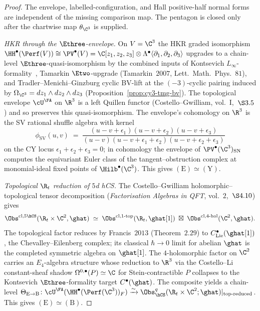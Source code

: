 \begin{proof}
The envelope, labelled-configuration, and Hall positive-half normal
forms are independent of the missing comparison map. The pentagon is
closed only after the chartwise map $\theta_{\C^3}$ is supplied.

\emph{HKR through the $\Ethree$-envelope.} On $V=\C^3$ the HKR graded
isomorphism
$\HH^\bullet(\Perf(V))\cong\PV^\bullet(V)=\C[z_1,z_2,z_3]\otimes
\Lambda^\bullet\langle\partial_1,\partial_2,\partial_3\rangle$
upgrades to a chain-level $\Ethree$-quasi-isomorphism by the combined
inputs of Kontsevich $L_\infty$-formality~\cite{Kontsevich1999},
Tamarkin $\Etwo$-upgrade (Tamarkin~$2007$,
Lett.~Math.~Phys.~$81$), and Tradler--Menichi--Ginzburg cyclic
BV-lift at the $(-3)$-cyclic pairing induced by
$\Omega_{\C^3}=dz_1\wedge dz_2\wedge dz_3$
\textup{(}Proposition~\ref{prop:cy3-tmg-bv}\textup{)}. The topological
envelope $\cU^\FA$ on $\R^3$ is a left Quillen functor
\textup{(}Costello--Gwilliam, vol.~I,~$\S 3.5$\textup{)} and so
preserves this quasi-isomorphism. The envelope's cohomology on $\R^3$
is the SV rational shuffle algebra with kernel
\[
\phi_{\mathrm{SV}}(u,v)\;=\;
\frac{(u-v+\epsilon_1)(u-v+\epsilon_2)(u-v+\epsilon_3)}
{(u-v)(u-v+\epsilon_1+\epsilon_2)(u-v+\epsilon_2+\epsilon_3)}
\]
on the CY locus $\epsilon_1+\epsilon_2+\epsilon_3=0$; in cohomology the
envelope of $\PV^\bullet(\C^3)_{\mathrm{SN}}$ computes the equivariant
Euler class of the tangent--obstruction complex at monomial-ideal fixed
points of $\Hilb^\bullet(\C^3)$. This gives
$(\mathrm E)\simeq(\mathrm Y)$.

\emph{Topological $\R_t$ reduction of $5$d hCS.} The
Costello--Gwilliam holomorphic--topological tensor decomposition
\textup{(}\emph{Factorisation Algebras in QFT},
vol.~$2$,~$\S 4.10$\textup{)} gives
\[
\Obs^{\mathrm{cl},5\hCS}(\R_t\times\C^2,\ghat)
\;\simeq\;
\Obs^{\mathrm{cl},1\text{-top}}(\R_t,\ghat[1])
\;\boxtimes\;
\Obs^{\mathrm{cl},4\text{-hol}}(\C^2,\ghat).
\]
The topological factor reduces by Francis~$2013$
\textup{(}Theorem~$2.29$\textup{)} to
$C^\bullet_{\mathrm{Lie}}(\ghat[1])$, the Chevalley--Eilenberg complex;
its classical $\hbar\to 0$ limit for abelian $\ghat$ is the completed
symmetric algebra on $\ghat[1]$. The $4$-holomorphic factor on $\C^2$
carries an $E_4$-algebra structure whose reduction to $\R^3$ via the
Costello--Li constant-sheaf shadow
$\Omega^{0,\bullet}(P)\simeq\C$ for Stein-contractible $P$
collapses to the Kontsevich $\Ethree$-formality target
$C^\bullet(\ghat)$. The composite yields a chain-level
$\Theta_{\mathrm E\to\mathrm B}\colon
\cU^\FA(\HH^\bullet(\Perf(\C^3))_F)\xrightarrow{\sim}
\Obs_{\hCS}^{q}(\R_t\times\C^2;\ghat)|_{\mathrm{top\text{-}reduced}}$.
This gives $(\mathrm E)\simeq(\mathrm B)$.


\end{proof}
